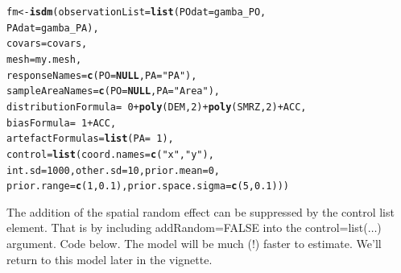 \documentclass[article,shortnames,nojss]{jss}\usepackage[]{graphicx}\usepackage[]{xcolor}
\makeatletter
\newcommand{\hlnum}[1]{\textcolor[rgb]{0.686,0.059,0.569}{#1}}%
\newcommand{\hlstr}[1]{\textcolor[rgb]{0.192,0.494,0.8}{#1}}%
\newcommand{\hlopt}[1]{\textcolor[rgb]{0,0,0}{#1}}%
\newcommand{\hlstd}[1]{\textcolor[rgb]{0.345,0.345,0.345}{#1}}%
\newcommand{\hlkwa}[1]{\textcolor[rgb]{0.161,0.373,0.58}{\textbf{#1}}}%
\newcommand{\hlkwb}[1]{\textcolor[rgb]{0.69,0.353,0.396}{#1}}%
\newcommand{\hlkwc}[1]{\textcolor[rgb]{0.333,0.667,0.333}{#1}}%
\newcommand{\hlkwd}[1]{\textcolor[rgb]{0.737,0.353,0.396}{\textbf{#1}}}%
\newenvironment{kframe}{%
 \def\at@end@of@kframe{}%
 \ifinner\ifhmode%
  \def\at@end@of@kframe{\end{minipage}}%
  \begin{minipage}{\columnwidth}%
 \fi\fi%
 \def\FrameCommand##1{\hskip\@totalleftmargin \hskip-\fboxsep
 \colorbox{shadecolor}{##1}\hskip-\fboxsep
     \hskip-\linewidth \hskip-\@totalleftmargin \hskip\columnwidth}%
 \MakeFramed {\advance\hsize-\width
   \@totalleftmargin\z@ \linewidth\hsize
   \@setminipage}}%
 {\par\unskip\endMakeFramed%
 \at@end@of@kframe}
\newenvironment{knitrout}{}{} %
\makeatother
\begin{document}
\begin{knitrout}
\color{fgcolor}\begin{kframe}
\begin{alltt}
\hlstd{fm} \hlkwb{<-} \hlkwd{isdm}\hlstd{(} \hlkwc{observationList}\hlstd{=}\hlkwd{list}\hlstd{(} \hlkwc{POdat}\hlstd{=gamba_PO,}
                                  \hlkwc{PAdat}\hlstd{=gamba_PA),}
            \hlkwc{covars}\hlstd{=covars,}
            \hlkwc{mesh}\hlstd{=my.mesh,}
            \hlkwc{responseNames}\hlstd{=}\hlkwd{c}\hlstd{(} \hlkwc{PO}\hlstd{=}\hlkwa{NULL}\hlstd{,} \hlkwc{PA}\hlstd{=}\hlstr{"PA"}\hlstd{),}
            \hlkwc{sampleAreaNames}\hlstd{=}\hlkwd{c}\hlstd{(} \hlkwc{PO}\hlstd{=}\hlkwa{NULL}\hlstd{,} \hlkwc{PA}\hlstd{=}\hlstr{"Area"}\hlstd{),}
            \hlkwc{distributionFormula}\hlstd{=}\hlopt{~}\hlnum{0}\hlopt{+}\hlkwd{poly}\hlstd{( DEM,} \hlnum{2}\hlstd{)} \hlopt{+} \hlkwd{poly}\hlstd{( SMRZ,}\hlnum{2}\hlstd{)} \hlopt{+} \hlstd{ACC,}
            \hlkwc{biasFormula}\hlstd{=}\hlopt{~}\hlnum{1}\hlopt{+}\hlstd{ACC,}
            \hlkwc{artefactFormulas}\hlstd{=}\hlkwd{list}\hlstd{(} \hlkwc{PA}\hlstd{=}\hlopt{~}\hlnum{1}\hlstd{),}
            \hlkwc{control}\hlstd{=}\hlkwd{list}\hlstd{(} \hlkwc{coord.names}\hlstd{=}\hlkwd{c}\hlstd{(}\hlstr{"x"}\hlstd{,}\hlstr{"y"}\hlstd{),}
                          \hlkwc{int.sd}\hlstd{=}\hlnum{1000}\hlstd{,} \hlkwc{other.sd}\hlstd{=}\hlnum{10}\hlstd{,} \hlkwc{prior.mean}\hlstd{=}\hlnum{0}\hlstd{,}
                          \hlkwc{prior.range}\hlstd{=}\hlkwd{c}\hlstd{(}\hlnum{1}\hlstd{,}\hlnum{0.1}\hlstd{),} \hlkwc{prior.space.sigma}\hlstd{=}\hlkwd{c}\hlstd{(} \hlnum{5}\hlstd{,}\hlnum{0.1}\hlstd{)))}
\end{alltt}
\end{kframe}
\end{knitrout}

The addition of the spatial random effect can be suppressed by the control list element. That is by including addRandom=FALSE into the control=list($\ldots$) argument. Code below. The model will be much (!) faster to estimate.  We'll return to this model later in the vignette.
  
\end{document}
